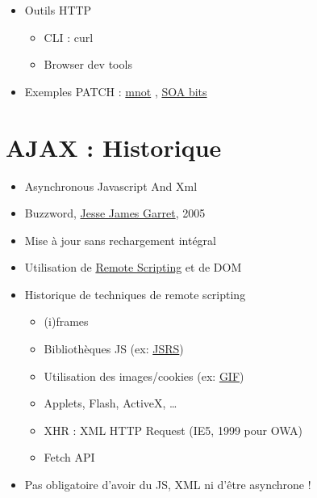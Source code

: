 \begin{itemize}
\tightlist
\item
  Outils HTTP

  \begin{itemize}
  \tightlist
  \item
    CLI : curl
  \item
    Browser dev tools
  \end{itemize}
\item
  Exemples PATCH :
  \href{http://www.mnot.net/blog/2012/09/05/patch}{mnot} ,
  \href{http://soabits.blogspot.ch/2013/01/http-put-patch-or-post-partial-updates.html}{SOA
  bits}
\end{itemize}

\hypertarget{ajax-historique}{%
\section{AJAX : Historique}\label{ajax-historique}}

\begin{itemize}
\tightlist
\item
  Asynchronous Javascript And Xml
\item
  Buzzword,
  \href{http://web.archive.org/web/20110102130434/http://www.adaptivepath.com/ideas/essays/archives/000385.php}{Jesse
  James Garret}, 2005
\item
  Mise à jour sans rechargement intégral
\item
  Utilisation de
  \href{https://en.wikipedia.org/wiki/Remote_scripting}{Remote
  Scripting} et de DOM
\item
  Historique de techniques de remote scripting

  \begin{itemize}
  \tightlist
  \item
    (i)frames
  \item
    Bibliothèques JS (ex:
    \href{http://www.ashleyit.com/rs/jsrs/test.htm}{JSRS})
  \item
    Utilisation des images/cookies (ex:
    \href{http://web.archive.org/web/20100916110710/http://depressedpress.com/Content/Development/JavaScript/Articles/GIFAsPipe/Index.cfm}{GIF})
  \item
    Applets, Flash, ActiveX, \ldots{}
  \item
    {XHR : XML HTTP Request} (IE5, 1999 pour OWA)
  \item
    Fetch API
  \end{itemize}
\item
  Pas obligatoire d'avoir du JS, XML ni d'être asynchrone !
\end{itemize}

